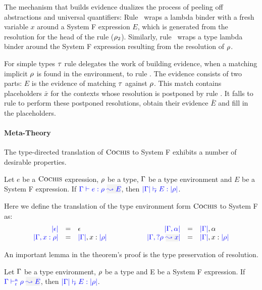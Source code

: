 The mechanism that builds evidence dualizes the process of peeling off
abstractions and universal quantifiers: Rule ~wraps a lambda
binder with a fresh variable $x$ around a System F expression $E$, which is
generated from the resolution for the head of the rule ($\rulet_2$). Similarly,
rule ~wraps a type lambda binder around the System F expression
resulting from the resolution of $\rulet$.

For simple types $\type$ rule  delegates the work of
building evidence, when a matching implicit $\rulet$ is found in the
environment, to rule . The evidence consists of two parts:
$E$ is the evidence of matching $\type$ against $\rulet$. This match contains
placeholders $\bar{x}$ for the contexts whose resolution is postponed by rule
. It falls to rule  to perform these
postponed resolutions, obtain their evidence $\bar{E}$ and fill in the
placeholders.

\paragraph{Meta-Theory} The type-directed translation of $\name$ to System F exhibits a number
of desirable properties.

\begin{theorem}\label{thm:type:preservation} Let $e$ be a $\name$
  expression, $\rulet$ be a type, $\tenv$ be a type environment and $E$ be a System F expression. If
  $\wte{\tenv}{e}{\rulet}{E}$, then $\fwte{\etrans{\tenv}}{E}{\ttrans[\rulet]}$.
\end{theorem}
Here we define the translation of the type environment form $\name$ to System F as:
\begin{equation*}
\begin{array}{rcl@{\hspace{2cm}}rcl}
\etrans{\epsilon} & = & \epsilon & \etrans{\tenv,\alpha} & = & \etrans{\tenv}, \alpha \\
\etrans{\tenv,x : \rulet} & = & \etrans{\tenv}, x : \ttrans[\rulet] &
\etrans{\tenv, \envi{\rulet}{x}} & = & \etrans{\tenv}, x : \ttrans[\rulet]
\end{array}
\end{equation*}

An important lemma in the theorem's proof is the type preservation of 
resolution.
\begin{lemma}
Let $\tenv$ be a type environment, $\rulet$ be a type and E be a System F expression.
If $\ares{\tenv}{\rulet}{E}$, then $\fwte{\etrans{\tenv}}{E}{\ttrans[\rulet]}$.
\end{lemma}


